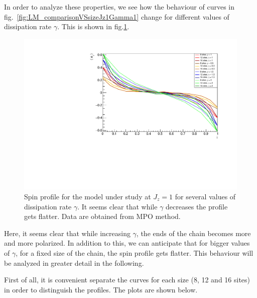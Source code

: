 In order to analyze these properties, we see how the behaviour of curves in fig.~\ref{fig:LM_comparisonVSsizeJz1Gamma1} change for different values of dissipation rate $\gamma$. This is shown in fig.\ref{fig:LMcompVSsizeANDdissRate}.

\begin{figure}[H]
    \centering
    \includegraphics[scale=0.7]{Figures/LMcomparisonVSsizeANDdissipationRate.pdf}
    \caption{Spin profile for the model under study at $J_z = 1$ for several values of dissipation rate $\gamma$. It seems clear that while $\gamma$ decreases the profile gets flatter. Data are obtained from MPO method.}
    \label{fig:LMcompVSsizeANDdissRate}
\end{figure}

Here, it seems clear that while increasing $\gamma$, the ends of the chain becomes more and more polarized. In addition to this, we can anticipate that for bigger values of $\gamma$, for a fixed size of the chain, the spin profile gets flatter. This behaviour will be analyzed in greater detail in the following.

First of all, it is convenient separate the curves for each size (8, 12 and 16 sites) in order to distinguish the profiles. The plots are shown below.

